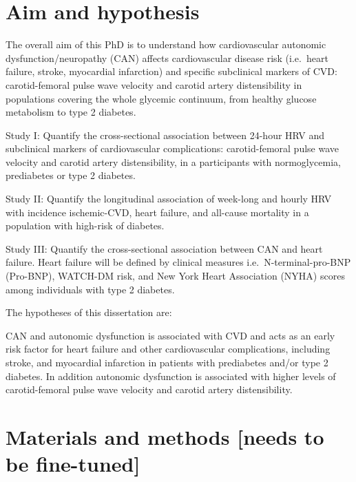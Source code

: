 \documentclass[
  a4paper,
  headsepline=true,
  open=any]{scrbook}
\begin{document}

\hypertarget{aim-and-hypothesis}{%
\chapter{Aim and hypothesis}\label{aim-and-hypothesis}}

The overall aim of this PhD is to understand how cardiovascular
autonomic dysfunction/neuropathy (CAN) affects cardiovascular disease
risk (i.e.~heart failure, stroke, myocardial infarction) and specific
subclinical markers of CVD: carotid-femoral pulse wave velocity and
carotid artery distensibility in populations covering the whole glycemic
continuum, from healthy glucose metabolism to type 2 diabetes.

Study I: Quantify the cross-sectional association between 24-hour HRV
and subclinical markers of cardiovascular complications: carotid-femoral
pulse wave velocity and carotid artery distensibility, in a participants
with normoglycemia, prediabetes or type 2 diabetes.

Study II: Quantify the longitudinal association of week-long and hourly
HRV with incidence ischemic-CVD, heart failure, and all-cause mortality
in a population with high-risk of diabetes.

Study III: Quantify the cross-sectional association between CAN and
heart failure. Heart failure will be defined by clinical measures
i.e.~N-terminal-pro-BNP (Pro-BNP), WATCH-DM risk, and New York Heart
Association (NYHA) scores among individuals with type 2 diabetes.

The hypotheses of this dissertation are:

CAN and autonomic dysfunction is associated with CVD and acts as an
early risk factor for heart failure and other cardiovascular
complications, including stroke, and myocardial infarction in patients
with prediabetes and/or type 2 diabetes. In addition autonomic
dysfunction is associated with higher levels of carotid-femoral pulse
wave velocity and carotid artery distensibility.


\hypertarget{materials-and-methods-needs-to-be-fine-tuned}{%
\chapter{Materials and methods {[}needs to be
fine-tuned{]}}\label{materials-and-methods-needs-to-be-fine-tuned}}
\end{document}

